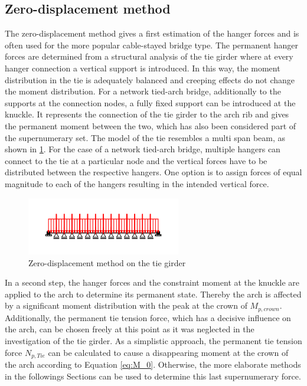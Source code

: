 \subsection{Zero-displacement method}
The zero-displacement method gives a first estimation of the hanger forces and is often used for the more popular cable-stayed bridge type. The permanent hanger forces are determined from a structural analysis of the tie girder where at every hanger connection a vertical support is introduced. In this way, the moment distribution in the tie is adequately balanced and creeping effects do not change the moment distribution. For a network tied-arch bridge, additionally to the supports at the connection nodes, a fully fixed support can be introduced at the knuckle. It represents the connection of the tie girder to the arch rib and gives the permanent moment between the two, which has also been considered part of the supernumerary set. The model of the tie resembles a multi span beam, as shown in \cref{fig:zero_disp}. For the case of a network tied-arch bridge, multiple hangers can connect to the tie at a particular node and the vertical forces have to be distributed between the respective hangers. One option is to assign forces of equal magnitude to each of the hangers resulting in the intended vertical force. 

\begin{figure}[H]
    \centering
    \includegraphics[trim={0 1cm 0 1cm},clip,width=0.6\textwidth]{illustrations/optimisation methods/zero-displacement.png}
    \caption{Zero-displacement method on the tie girder}
    \label{fig:zero_disp}
\end{figure}

In a second step, the hanger forces and the constraint moment at the knuckle are applied to the arch to determine its permanent state. Thereby the arch is affected by a significant moment distribution with the peak at the crown of $M_{p,crown}$. Additionally, the permanent tie tension force, which has a decisive influence on the arch, can be chosen freely at this point as it was neglected in the investigation of the tie girder. As a simplistic approach, the permanent tie tension force $N_{p,Tie}$ can be calculated to cause a disappearing moment at the crown of the arch according to Equation \cref{eq:M_0}. Otherwise, the more elaborate methods in the followings Sections can be used to determine this last supernumerary force.

